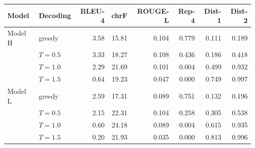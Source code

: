 \begin{tabular}{llrrrrrr}
\toprule
Model & Decoding & BLEU-4 & chrF & ROUGE-L & Rep-4 & Dist-1 & Dist-2 \\
\midrule
Model H & greedy & 3.58 & 15.81 & 0.104 & 0.779 & 0.111 & 0.189 \\
 & $T=0.5$ & 3.33 & 18.27 & 0.108 & 0.436 & 0.186 & 0.418 \\
 & $T=1.0$ & 2.29 & 21.69 & 0.101 & 0.004 & 0.499 & 0.932 \\
 & $T=1.5$ & 0.64 & 19.23 & 0.047 & 0.000 & 0.749 & 0.997 \\
\midrule
Model L & greedy & 2.59 & 17.31 & 0.089 & 0.751 & 0.132 & 0.196 \\
 & $T=0.5$ & 2.15 & 22.31 & 0.104 & 0.258 & 0.305 & 0.538 \\
 & $T=1.0$ & 0.60 & 24.18 & 0.089 & 0.004 & 0.615 & 0.935 \\
 & $T=1.5$ & 0.20 & 21.93 & 0.035 & 0.000 & 0.813 & 0.996 \\
\bottomrule
\end{tabular}
